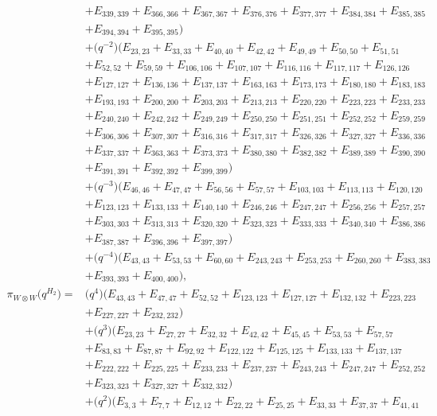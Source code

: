 \documentclass[pdftex]{sigma}
\numberwithin{equation}{section}
\theoremstyle{definition}
\begin{document}
\begin{align*}
&+E_{339,339}+E_{366,366}+E_{367,367}+E_{376,376}+E_{377,377}+E_{384,384}+E_{385,385}\\
&+E_{394,394}+E_{395,395})\\
&+\bigl(q^{-2}\bigr)(E_{23,23}+E_{33,33}+E_{40,40}+E_{42,42}+E_{49,49}+E_{50,50}+E_{51,51}\\
&+E_{52,52}+E_{59,59}+E_{106,106}+E_{107,107}+E_{116,116}+E_{117,117}+E_{126,126}\\
&+E_{127,127}+E_{136,136}+E_{137,137}+E_{163,163}+E_{173,173}+E_{180,180}+E_{183,183}\\
&+E_{193,193}+E_{200,200}+E_{203,203}+E_{213,213}+E_{220,220}+E_{223,223}+E_{233,233}\\
&+E_{240,240}+E_{242,242}+E_{249,249}+E_{250,250}+E_{251,251}+E_{252,252}+E_{259,259}\\
&+E_{306,306}+E_{307,307}+E_{316,316}+E_{317,317}+E_{326,326}+E_{327,327}+E_{336,336}\\
&+E_{337,337}+E_{363,363}+E_{373,373}+E_{380,380}+E_{382,382}+E_{389,389}+E_{390,390}\\
&+E_{391,391}+E_{392,392}+E_{399,399})\\
&+\bigl(q^{-3}\bigr)(E_{46,46}+E_{47,47}+E_{56,56}+E_{57,57}+E_{103,103}+E_{113,113}+E_{120,120}\\
&+E_{123,123}+E_{133,133}+E_{140,140}+E_{246,246}+E_{247,247}+E_{256,256}+E_{257,257}\\
&+E_{303,303}+E_{313,313}+E_{320,320}+E_{323,323}+E_{333,333}+E_{340,340}+E_{386,386}\\
&+E_{387,387}+E_{396,396}+E_{397,397})\\
&+\bigl(q^{-4}\bigr)(E_{43,43}+E_{53,53}+E_{60,60}+E_{243,243}+E_{253,253}+E_{260,260}+E_{383,383}\\
&+E_{393,393}+E_{400,400}),
\\
 \pi_{W \otimes W}\bigl(q^{H_2}\bigr) ={}&
\bigl(q^4\bigr)(E_{43,43}+E_{47,47}+E_{52,52}+E_{123,123}+E_{127,127}+E_{132,132}+E_{223,223}\\
&+E_{227,227}+E_{232,232})\\
&+\bigl(q^3\bigr)(E_{23,23}+E_{27,27}+E_{32,32}+E_{42,42}+E_{45,45}+E_{53,53}+E_{57,57}\\
&+E_{83,83}+E_{87,87}+E_{92,92}+E_{122,122}+E_{125,125}+E_{133,133}+E_{137,137}\\
&+E_{222,222}+E_{225,225}+E_{233,233}+E_{237,237}+E_{243,243}+E_{247,247}+E_{252,252}\\
&+E_{323,323}+E_{327,327}+E_{332,332})\\
&+\bigl(q^2\bigr)(E_{3,3}+E_{7,7}+E_{12,12}+E_{22,22}+E_{25,25}+E_{33,33}+E_{37,37}+E_{41,41}\\

\end{align*}
\end{document}
